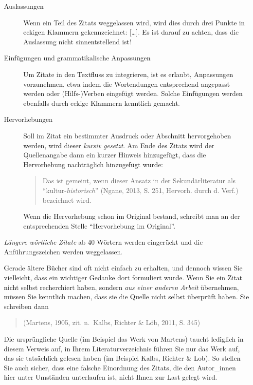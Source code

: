 \documentclass[
  bibliography=totoc,
  oneside,
  12pt,
  a4paper]{scrbook}
\begin{document}
\begin{description}
\item[Auslassungen]
Wenn ein Teil des Zitats weggelassen wird, wird dies durch drei
Punkte in eckigen Klammern gekennzeichnet:
{[}\ldots{]}. Es ist darauf zu achten, dass die
Auslassung nicht sinnentstellend ist!
\item[Einfügungen und grammatikalische Anpassungen]
Um Zitate in den Textfluss zu integrieren, ist es erlaubt,
Anpassungen vorzunehmen, etwa indem die Wortendungen entsprechend
angepasst werden oder (Hilfs-)Verben eingefügt werden. Solche
Einfügungen werden ebenfalls durch eckige Klammern
kenntlich gemacht.
\item[Hervorhebungen]
Soll im Zitat ein bestimmter Ausdruck oder Abschnitt hervorgehoben
werden, wird dieser \emph{kursiv gesetzt}. Am Ende des Zitats wird der
Quellenangabe dann ein kurzer Hinweis hinzugefügt, dass die
Hervorhebung nachträglich hinzugefügt wurde:

\begin{quote}
Das ist gemeint, wenn dieser Ansatz in der Sekundärliteratur als
``kultur-\emph{historisch}'' (Ngane, 2013, S. 251, Hervorh. durch d.
Verf.) bezeichnet wird.
\end{quote}

Wenn die Hervorhebung schon im Original bestand, schreibt man an der
entsprechenden Stelle ``Hervorhebung im Original''.
\end{description}

\emph{Längere wörtliche Zitate} ab 40 Wörtern werden eingerückt und die
Anführungszeichen werden weggelassen.

Gerade ältere Bücher sind oft nicht einfach zu erhalten, und dennoch
wissen Sie vielleicht, dass ein wichtiger Gedanke dort formuliert wurde.
Wenn Sie ein Zitat nicht selbst recherchiert haben, sondern \emph{aus einer
anderen Arbeit} übernehmen, müssen Sie kenntlich machen, dass sie die
Quelle nicht selbst überprüft haben. Sie schreiben dann

\begin{quote}
(Martens, 1905, zit. n.~Kalbs, Richter \& Löb, 2011, S. 345)
\end{quote}

Die ursprüngliche Quelle (im Beispiel das Werk von Martens) taucht lediglich in diesem Verweis auf, in Ihrem Literaturverzeichnis führen Sie nur das Werk auf, das sie tatsächlich gelesen haben (im Beispiel Kalbs, Richter \& Lob). So stellen Sie auch sicher, dass eine falsche Einordnung des Zitats, die den Autor\_innen hier unter Umständen unterlaufen ist, nicht Ihnen zur Last gelegt wird.
\end{document}
